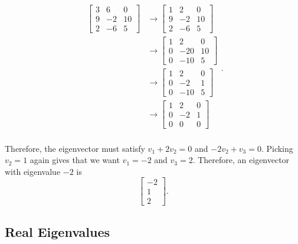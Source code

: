 \documentclass{ximera}
\begin{document}
\begin{exampleSol}
\[ 
    \begin{split}
        \begin{bmatrix} 
            3 & 6 & 0 \\ 
            9 & -2 & 10 \\ 
            2 & -6 & 5 
        \end{bmatrix}  
        &\rightarrow 
        \begin{bmatrix} 
            1 & 2 & 0 \\ 
            9 & -2 & 10 \\ 
            2 & -6 & 5 
        \end{bmatrix} \\
        &\rightarrow 
        \begin{bmatrix} 
            1 & 2 & 0 \\ 
            0 & -20 & 10 \\ 
            0 & -10 & 5 
        \end{bmatrix} \\
        &\rightarrow 
        \begin{bmatrix} 
            1 & 2 & 0 \\ 
            0 & -2 & 1 \\ 
            0 & -10 & 5 
        \end{bmatrix} \\
        &\rightarrow 
        \begin{bmatrix} 
            1 & 2 & 0 \\ 
            0 & -2 & 1 \\ 
            0 & 0 & 0 
        \end{bmatrix} \\
    \end{split}. 
\]

Therefore, the eigenvector must satisfy $v_1 + 2v_2 = 0$ and $-2v_2 + v_3 = 0$. Picking $v_2 = 1$ again gives that we want $v_1 = -2$ and $v_3 = 2$. Therefore, an eigenvector with eigenvalue $-2$ is 
\[ 
    \begin{bmatrix} 
        -2 \\ 
        1 \\ 
        2 
    \end{bmatrix}. 
\]
\end{exampleSol}

\subsection{Real Eigenvalues}
\end{document}
